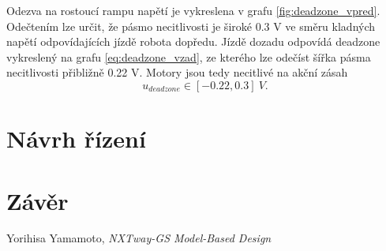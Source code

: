 \documentclass[conference]{IEEEtran}
\begin{document}
Odezva na rostoucí rampu napětí je vykreslena v grafu \ref{fig:deadzone_vpred}. Odečtením lze určit,
že pásmo necitlivosti je široké 0.3 \si{V} ve směru kladných napětí odpovídajících jízdě robota dopředu. 
Jízdě dozadu odpovídá deadzone vykreslený na grafu \ref{eq:deadzone_vzad}, ze kterého
lze odečíst šířka pásma necitlivosti přibližně 0.22 \si{V}. Motory jsou tedy necitlivé
na akční zásah
\begin{equation}
    u_{deadzone} \in [-0.22, 0.3] ~\si{V}.
\end{equation}

\section{Návrh řízení}

\section{Závěr}

\begin{thebibliography}{9}

    Yorihisa Yamamoto, \emph{NXTway-GS Model-Based Design} 
    \end{thebibliography}
\end{document}
